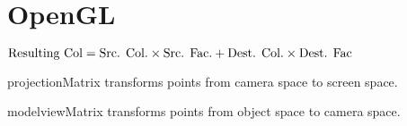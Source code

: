 \section{OpenGL}
$\text{Resulting Col} = \\
\text{Src. Col.} \times \text{Src. Fac.} + \text{Dest. Col.} \times \text{Dest. Fac}$

projectionMatrix transforms points from camera space to screen space.

modelviewMatrix transforms points from object space to camera space.

